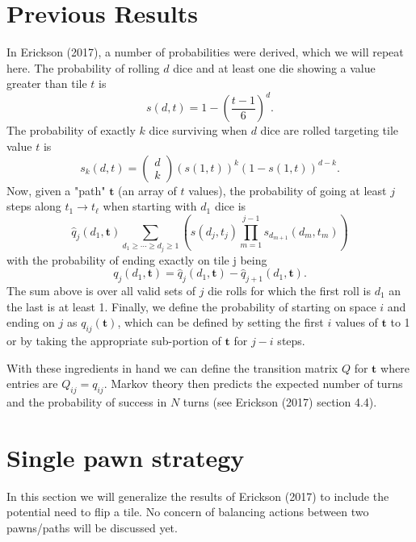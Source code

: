 \documentclass[letterpaper]{article}
\begin{document}
\section{Previous Results}
In Erickson (2017), a number of probabilities were derived, which we will
repeat here.  The probability of rolling $d$ dice and at least one die showing
a value greater than tile $t$ is
\begin{equation}
	s\left(d,t\right) = 1-\left(\frac{t-1}{6}\right)^d.
\end{equation}
The probability of exactly $k$ dice surviving when $d$ dice are rolled targeting
tile value $t$ is
\begin{equation}
	s_k\left(d,t\right)=\left(
	\begin{array}{c}
		d \\
		k
	\end{array} \right) \left(s\left(1,t\right)\right)^k
	\left(1-s\left(1,t\right)\right)^{d-k}.
\end{equation}
Now, given a "path" $\mathbf{t}$ (an array of $t$ values), the probability of
going at least $j$ steps along $t_1 \rightarrow t_\ell$ when starting with
$d_1$ dice is
\begin{equation}
	\hat{q}_j\left(d_1,\mathbf{t}\right) \sum_{d_1\geq\cdots\geq d_j\geq 1}
	\left( s\left(d_j,t_j\right)
	\prod_{m=1}^{j-1} s_{d_{m+1}}\left(d_m,t_m\right)\right)
\end{equation}
with the probability of ending exactly on tile j being
\begin{equation}
	q_j\left(d_1,\mathbf{t}\right)= \hat{q}_j\left(d_1,\mathbf{t}\right) -
	\hat{q}_{j+1}\left(d_1,\mathbf{t}\right).
\end{equation}
The sum above is over all valid sets of $j$ die rolls for which the first roll
is $d_1$ an the last is at least 1.  Finally, we define the probability of
starting on space $i$ and ending on $j$ as $q_{ij}(\mathbf{t})$, which can be
defined by setting the first $i$ values of $\mathbf{t}$ to 1 or by taking the
appropriate sub-portion of $\mathbf{t}$ for $j-i$ steps.

With these ingredients in hand we can define the transition matrix $Q$ for
$\mathbf{t}$ where entries are $Q_{ij}=q_{ij}$.  Markov theory then predicts
the expected number of turns and the probability of success in $N$ turns (see
Erickson (2017) section 4.4).  

\section{Single pawn strategy}
In this section we will generalize the results of Erickson (2017) to include
the potential need to flip a tile.  No concern of balancing actions between two
pawns/paths will be discussed yet.
\end{document}

